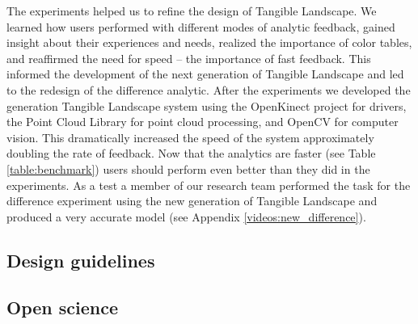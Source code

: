 \documentclass[prodmode,acmtochi]{acmsmall} %
\begin{document}
The experiments helped us to refine the design of Tangible Landscape. 
We learned how users performed with different modes of analytic feedback, 
gained insight about their experiences and needs,
realized the importance of color tables, 
and reaffirmed the need for speed -- the importance of fast feedback. 
This informed the development of the next generation of Tangible Landscape 
and led to the redesign of the difference analytic. 
After the experiments
we developed the  generation Tangible Landscape system
using 
the OpenKinect project for drivers,
the Point Cloud Library for point cloud processing, 
and OpenCV for computer vision. 
This dramatically increased the speed of the system
approximately doubling the rate of feedback.
Now that the analytics are faster (see Table \ref{table:benchmark})
users should perform even better than they did in the experiments.
As a test a member of our research team 
performed the task for the difference experiment 
using the new generation of Tangible Landscape
and produced a very accurate model  
(see Appendix \ref{videos:new_difference}).





\subsection{Design guidelines}

% 
%









\subsection{Open science} 

% 
%
\end{document}
